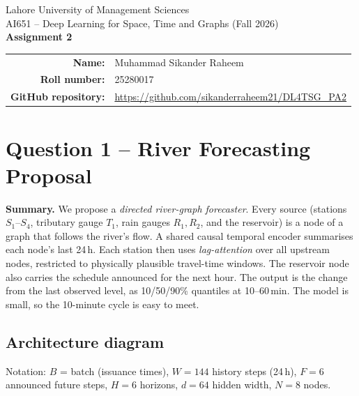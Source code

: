 \documentclass[11pt,a4paper]{article}
\begin{document}
\begin{center}
  {\large Lahore University of Management Sciences}\\[2pt]
  AI651 -- Deep Learning for Space, Time and Graphs \quad (Fall 2026)\\[8pt]
  {\LARGE\bfseries Assignment 2}\\[8pt]
  \begin{tabular}{rl}
    \textbf{Name:} & Muhammad Sikander Raheem \\
    \textbf{Roll number:} & 25280017 \\
    \textbf{GitHub repository:} & \url{https://github.com/sikanderraheem21/DL4TSG_PA2}
  \end{tabular}
\end{center}

\tableofcontents

\section{Question 1 -- River Forecasting Proposal}
\renewcommand{\thefigure}{Q1.\arabic{figure}}
\renewcommand{\thetable}{Q1.\arabic{table}}

\noindent\textbf{Summary.} We propose a \emph{directed river-graph forecaster}.
Every source (stations $S_1$--$S_4$, tributary gauge $T_1$, rain gauges
$R_1,R_2$, and the reservoir) is a node of a graph that follows the river's flow.
A shared causal temporal encoder summarises each node's last 24\,h. Each
station then uses \emph{lag-attention} over all upstream nodes, restricted to
physically plausible travel-time windows. The reservoir node also carries the
schedule announced for the next hour. The output is the change from the last
observed level, as 10/50/90\% quantiles at 10--60\,min. The model is small, so
the 10-minute cycle is easy to meet.


\subsection{Architecture diagram}
Notation: $B$ = batch (issuance times), $W=144$ history steps (24\,h), $F=6$
announced future steps, $H=6$ horizons, $d=64$ hidden width, $N=8$ nodes.
\end{document}
